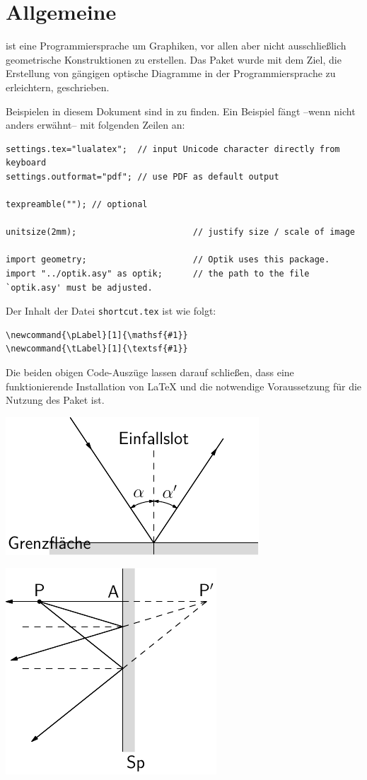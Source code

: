 \chapter{Allgemeine}

\asypmtote\cite{Asymptote} ist eine Programmiersprache um Graphiken, vor allen aber nicht ausschließlich geometrische Konstruktionen zu erstellen.
Das Paket \optik{} wurde mit dem Ziel, die Erstellung von gängigen optische Diagramme in der Programmiersprache \asypmtote{} zu erleichtern, geschrieben.


Beispielen in diesem Dokument sind in \repo{} zu finden. 
Ein Beispiel fängt --wenn nicht anders erwähnt-- mit folgenden Zeilen an:

\begin{verbatim}
settings.tex="lualatex";  // input Unicode character directly from keyboard
settings.outformat="pdf"; // use PDF as default output

texpreamble(""); // optional

unitsize(2mm);                       // justify size / scale of image

import geometry;                     // Optik uses this package.
import "../optik.asy" as optik;      // the path to the file `optik.asy' must be adjusted.
\end{verbatim}


Der Inhalt der Datei \verb|shortcut.tex| ist wie folgt:

\begin{verbatim}
\newcommand{\pLabel}[1]{\mathsf{#1}}
\newcommand{\tLabel}[1]{\textsf{#1}}
\end{verbatim}


Die beiden obigen Code-Auszüge lassen darauf schließen, 
dass eine funktionierende Installation von \LaTeX{} und \asypmtote{} die notwendige Voraussetzung für die Nutzung des Paket \optik{} ist.


\includegraphics{asy/demomirror}

\includegraphics{asy/demoverticalmirror}


